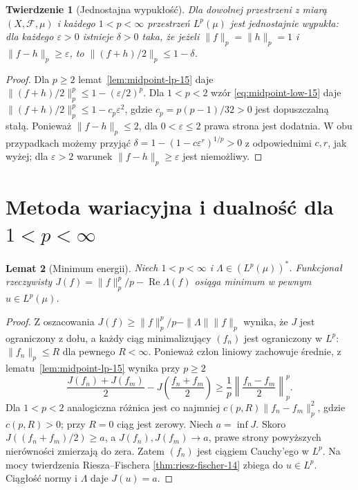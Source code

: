 \documentclass[11pt,a4paper,oneside]{book}
\numberwithin{equation}{chapter}
\theoremstyle{plain}
\newtheorem{twierdzenie}{Twierdzenie}[chapter]
\newtheorem{lemat}[twierdzenie]{Lemat}
\theoremstyle{definition}
\theoremstyle{remark}
\begin{document}
\begin{twierdzenie}[Jednostajna wypukłość]
\label{thm:uniform-convexity-15}
Dla dowolnej przestrzeni z miarą $(X,\mathcal F,\mu)$
i każdego $1<p<\infty$ przestrzeń $L^p(\mu)$ jest
\emph{jednostajnie wypukła}: dla każdego $\varepsilon>0$
istnieje $\delta>0$ taka, że jeżeli $\|f\|_p=\|h\|_p=1$
i $\|f-h\|_p\ge\varepsilon$, to
$\|(f+h)/2\|_p\le1-\delta$.
\end{twierdzenie}
\begin{proof}
Dla $p\ge2$ lemat~\ref{lem:midpoint-lp-15} daje
$\|(f+h)/2\|_p^p\le1-(\varepsilon/2)^p$.
Dla $1<p<2$ wzór \eqref{eq:midpoint-low-15} daje
$\|(f+h)/2\|_p^p\le1-c_p\varepsilon^2$,
gdzie $c_p=p(p-1)/32>0$ jest dopuszczalną stałą.
Ponieważ $\|f-h\|_p\le2$, dla $0<\varepsilon\le2$
prawa strona jest dodatnia. W obu przypadkach
możemy przyjąć $\delta=1-(1-c\varepsilon^r)^{1/p}>0$
z odpowiednimi $c,r$, jak wyżej; dla $\varepsilon>2$
warunek $\|f-h\|_p\ge\varepsilon$ jest niemożliwy.
\end{proof}

\section{Metoda wariacyjna i dualność dla $1<p<\infty$}
\begin{lemat}[Minimum energii]
\label{lem:variational-lp-15}
Niech $1<p<\infty$ i $\Lambda\in(L^p(\mu))^*$.
Funkcjonał rzeczywisty
$J(f)=\|f\|_p^p/p-\operatorname{Re}\Lambda(f)$
osiąga minimum w pewnym $u\in L^p(\mu)$.
\end{lemat}
\begin{proof}
Z oszacowania $J(f)\ge\|f\|_p^p/p-\|\Lambda\|\|f\|_p$
wynika, że $J$ jest ograniczony z dołu, a każdy ciąg
minimalizujący $(f_n)$ jest ograniczony w $L^p$:
$\|f_n\|_p\le R$ dla pewnego $R<\infty$.
Ponieważ człon liniowy zachowuje średnie, z
lematu~\ref{lem:midpoint-lp-15} wynika przy $p\ge2$
\[
\frac{J(f_n)+J(f_m)}2-J\left(\frac{f_n+f_m}{2}\right)
\ge\frac1p\left\|\frac{f_n-f_m}{2}\right\|_p^p.
\]
Dla $1<p<2$ analogiczna różnica jest co najmniej
$c(p,R)\|f_n-f_m\|_p^2$, gdzie $c(p,R)>0$;
przy $R=0$ ciąg jest zerowy. Niech $a=\inf J$.
Skoro $J((f_n+f_m)/2)\ge a$, a $J(f_n),J(f_m)\to a$,
prawe strony powyższych nierówności zmierzają do zera.
Zatem $(f_n)$ jest ciągiem Cauchy'ego w $L^p$.
Na mocy twierdzenia Riesza--Fischera
\ref{thm:riesz-fischer-14} zbiega do $u\in L^p$.
Ciągłość normy i $\Lambda$ daje $J(u)=a$.
\end{proof}
\end{document}
